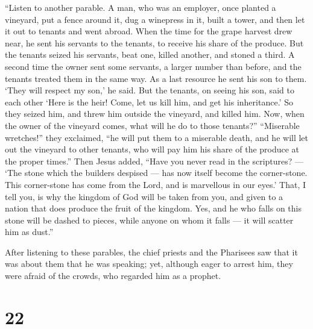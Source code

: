  ``Listen to another parable. A man, who was an employer,
once planted a vineyard, put a fence around it, dug a winepress in it,
built a tower, and then let it out to tenants and went abroad.
 When the time for the grape harvest drew near, he sent his
servants to the tenants, to receive his share of the produce.
 But the tenants seized his servants, beat one, killed
another, and stoned a third.  A second time the owner sent
some servants, a larger number than before, and the tenants treated them
in the same way.  As a last resource he sent his son to
them. `They will respect my son,' he said.  But the
tenants, on seeing his son, said to each other `Here is the heir! Come,
let us kill him, and get his inheritance.'  So they seized
him, and threw him outside the vineyard, and killed him. 
Now, when the owner of the vineyard comes, what will he do to those
tenants?''  ``Miserable wretches!'' they exclaimed, ``he
will put them to a miserable death, and he will let out the vineyard to
other tenants, who will pay him his share of the produce at the proper
times.''  Then Jesus added, ``Have you never read in the
scriptures? --- `The stone which the builders despised --- has now
itself become the corner-stone. This corner-stone has come from the
Lord, and is marvellous in our eyes.'  That, I tell you, is
why the kingdom of God will be taken from you, and given to a nation
that does produce the fruit of the kingdom.  Yes, and he
who falls on this stone will be dashed to pieces, while anyone on whom
it falls --- it will scatter him as dust.''

 After listening to these parables, the chief priests and
the Pharisees saw that it was about them that he was speaking;
 yet, although eager to arrest him, they were afraid of the
crowds, who regarded him as a prophet.

\hypertarget{section-21}{%
\section{22}\label{section-21}}

